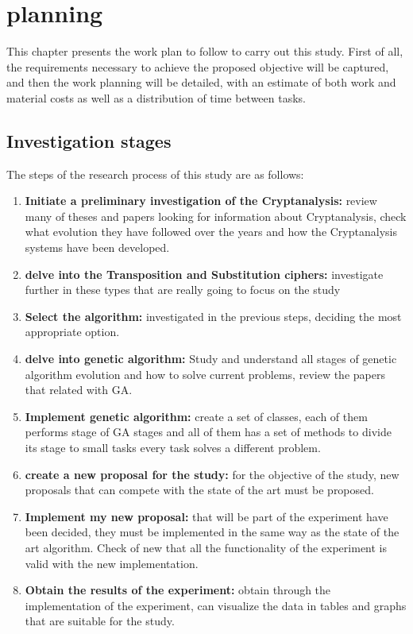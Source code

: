 \chapter{planning}

This chapter presents the work plan to follow to carry out this study. First of all, the requirements necessary to achieve the proposed objective will be captured, and then the work planning will be detailed, with an estimate of both work and material costs as well as a distribution of time between tasks.

\section{Investigation stages}
The steps of the research process of this study are as follows:

\begin{enumerate}
    \item{\textbf{Initiate a preliminary investigation of the Cryptanalysis:} review many of theses and papers looking for information about Cryptanalysis, check what evolution they have followed over the years and how the Cryptanalysis systems have been developed.}
    \item{\textbf{delve into the Transposition and Substitution ciphers:} investigate further in these types that are really going to focus on the study}
    \item {\textbf{Select the algorithm:} investigated in the previous steps, deciding the most appropriate option.}
    \item {\textbf{delve into genetic algorithm:} Study and understand all stages of genetic algorithm evolution and how to solve current problems, review the papers that related with GA.}
    \item {\textbf{Implement genetic algorithm:} create a set of classes, each of them performs stage of GA stages and all of them has a set of methods to divide its stage to small tasks every task solves a different problem.}
    \item {\textbf{create a new proposal for the study:} for the objective of the study, new proposals that can compete with the state of the art must be proposed.}
    \item {\textbf{Implement my new proposal:} that will be part of the experiment have been decided, they must be implemented in the same way as the state of the art algorithm. Check of new that all the functionality of the experiment is valid with the new implementation.}
    \item {\textbf{Obtain the results of the experiment:} obtain through the implementation of the experiment, can visualize the data in tables and graphs that are suitable for the study.}

\end{enumerate}
